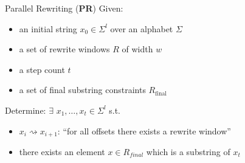 \documentclass[11pt,usenames,dvipsnames,
hyperref={pdfencoding=auto,psdextra}]{beamer}
\newcommand*{\PR}{\textbf{PR}}
\newcommand{\Rfinal}{R_{\text{final}}}
\begin{document}
\begin{frame}{Parallel Rewriting (\PR{})}
  Given: 
  \begin{itemize}
    \item an initial string $x_0 \in \Sigma^l$ over an alphabet $\Sigma$ \\
    \item a set of rewrite windows $R$ of width $w$ \\ 
    \item a step count $t$ \\
    \item a set of final substring constraints $\Rfinal$ \\
  \end{itemize}
  Determine: $\exists$ $x_1, \ldots, x_t \in \Sigma^l$ s.t.\ 
  \begin{itemize}
    \item $x_i \rightsquigarrow x_{i+1}$: ``for all offsets there exists a rewrite window''
    \item there exists an element $x \in R_{\mathit{final}}$ which is a substring of $x_t$
  \end{itemize}
\end{frame}
\end{document}
